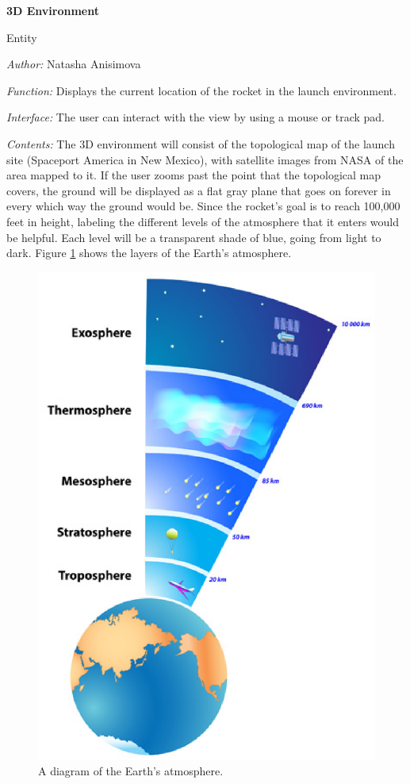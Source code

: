 \documentclass[10pt,draftclsnofoot,onecolumn]{IEEEtran}
\newcommand{\newinterface}[5]{

		\noindent\textbf{#2}
		
		\noindent Entity
		
		\noindent\textit{Author:} {#1}
		
		\noindent\textit{Function:} {#3}
		
		\noindent\textit{Interface:} {#4}		

		\noindent\textit{Contents:} {#5}
		\vspace{.5cm}
}
\begin{document}
	\newinterface
	{Natasha Anisimova}
	{3D Environment}
	{Displays the current location of the rocket in the launch environment.}
	{The user can interact with the view by using a mouse or track pad.}
	{
		The 3D environment will consist of the topological map of the launch site (Spaceport America in New Mexico), with satellite images from NASA of the area mapped to it. If the user zooms past the point that the topological map covers, the ground will be displayed as a flat gray plane that goes on forever in every which way the ground would be. Since the rocket's goal is to reach 100,000 feet in height, labeling the different levels of the atmosphere that it enters would be helpful. Each level will be a transparent shade of blue, going from light to dark. Figure \ref{fig:2} shows the layers of the Earth's atmosphere.
	}
	\begin{center}
	\begin{figure}[htbp!]
		\centering\includegraphics[width = 120mm]{earth-atmosphere-layers.eps}
		\caption{A diagram of the Earth's atmosphere.}
		\label{fig:2}
	\end{figure}
	\end{center}
\end{document}
